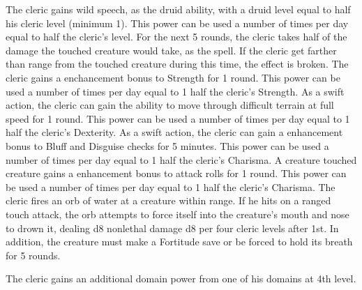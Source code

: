  The cleric gains wild speech, as the druid ability, with a druid level equal to half his cleric level (minimum 1). This power can be used a number of times per day equal to half the cleric's level.
 For the next 5 rounds, the cleric takes half of the damage the touched creature would take, as the  spell. If the cleric get farther than \rngmed range from the touched creature during this time, the effect is broken.
 The cleric gains a  enchancement bonus to Strength for 1 round. \bonusscalingdescription This power can be used a number of times per day equal to 1 \add half the cleric's Strength.
 As a swift action, the cleric can gain the ability to move through difficult terrain at full speed for 1 round. This power can be used a number of times per day equal to 1 \add half the cleric's Dexterity.
 As a swift action, the cleric can gain a  enhancement bonus to Bluff and Disguise checks for 5 minutes. This power can be used a number of times per day equal to 1 \add half the cleric's Charisma.
 A creature touched creature gains a  enhancement bonus to attack rolls for 1 round. \bonusscalingdescription This power can be used a number of times per day equal to 1 \add half the cleric's Charisma.
 The cleric fires an orb of water at a creature within \rngclose range. If he hits on a ranged touch attack, the orb attempts to force itself into the creature's mouth and nose to drown it, dealing d8 nonlethal damage \add d8 per four cleric levels after 1st. In addition, the creature must make a Fortitude save or be forced to hold its breath for 5 rounds.

The cleric gains an additional domain power from one of his domains at 4th level.

